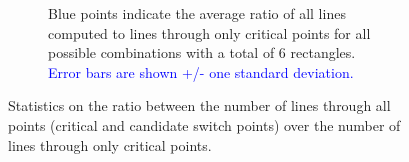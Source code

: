 \begin{figure}[ht]
\begin{subfigure}[t]{0.48\textwidth}

    \caption{Blue points indicate the average ratio of all lines computed to lines through only critical points for all possible combinations with a total of $6$ rectangles. \textcolor{blue}{Error bars are shown +/- one standard deviation.}}
       \label{fig:stats_cl_2}
    \end{subfigure}
    \caption{Statistics on the ratio between the number of lines through all points (critical and candidate switch points) over the number of lines through only critical points.  }
    \label{fig:stats_cl}
\end{figure}
